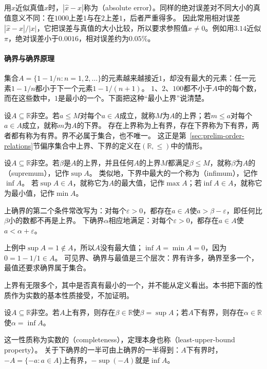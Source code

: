 用$\hat x$近似真值$x$时，$|\hat x-x|$称为（absolute error）。同样的绝对误差对不同大小的真值意义不同：在$1000$上差$1$与在$2$上差$1$，后者严重得多。
因此常用相对误差$|\hat x-x|/|x|$，它把误差与真值的大小比较，所以要求参照值$x\neq0$。例如用$3.14$近似$\pi$，绝对误差小于$0.0016$，相对误差约为$0.05\%$。

\paragraph{确界与确界原理}
\label{sec:ru-supremum-completeness}
集合$A=\{1-1/n:n=1,2,\ldots\}$的元素越来越接近$1$，却没有最大的元素：任一元素$1-1/n$都小于下一个元素$1-1/(n+1)$。
$1$、$2$、$100$都不小于$A$中的每个数，而在这些数中，$1$是最小的一个。下面把这种“最小上界”说清楚。

设$A\subseteq\mathbb R$非空。若$a\leq M$对每个$a\in A$成立，就称$M$为$A$的上界；若$m\leq a$对每个$a\in A$成立，就称$m$为$A$的下界。
存在上界称为上有界，存在下界称为下有界，两者都有称为有界。界不必属于集合，也不唯一。
这正是第~\ref{sec:prelim-order-relations}节偏序集合中上界、下界的定义在$(\mathbb R,\leq)$中的情形。

\begin{definition}[上确界与下确界]
\label{def:ru-supremum}
设$A\subseteq\mathbb R$非空。若$\beta$是$A$的上界，并且任何$A$的上界$M$都满足$\beta\leq M$，就称$\beta$为$A$的（supremum），记作$\sup A$。
类似地，下界中最大的一个称为（infimum），记作$\inf A$。
若$\sup A\in A$，就称它为$A$的最大值，记作$\max A$；若$\inf A\in A$，就称它为最小值，记作$\min A$。
\end{definition}

上确界的第二个条件常改写为：对每个$\varepsilon>0$，都存在$a\in A$使$a>\beta-\varepsilon$，即任何比$\beta$小的数都不再是上界。
下确界$\alpha$相应地满足：对每个$\varepsilon>0$，都存在$a\in A$使$a<\alpha+\varepsilon$。

上例中$\sup A=1\notin A$，所以$A$没有最大值；$\inf A=\min A=0$，因为$0=1-1/1\in A$。
可见界、确界与最值是三个层次：界有许多，确界至多一个，最值还要求确界属于集合。

上界有无限多个，其中是否真有最小的一个，并不能从定义看出。本书把下面的性质作为实数的基本性质接受，不加证明。
\begin{theorem}[确界原理]
\label{thm:ru-least-upper-bound}
设$A\subseteq\mathbb R$非空。若$A$上有界，则存在$\beta\in\mathbb R$使$\beta=\sup A$；若$A$下有界，则存在$\alpha\in\mathbb R$使$\alpha=\inf A$。
\end{theorem}
这一性质称为实数的（completeness），定理本身也称（least-upper-bound property）。
关于下确界的一半可由上确界的一半得到：$A$下有界时，$-A=\{-a:a\in A\}$上有界，$-\sup(-A)$就是$\inf A$。

